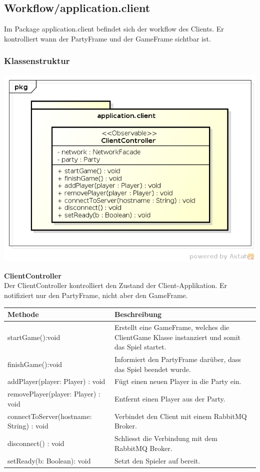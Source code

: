 \documentclass[11pt]{scrartcl}
\begin{document}
\newpage

\subsection{Workflow/application.client}
Im Package application.client befindet sich der workflow des Clients. Er kontrolliert wann der PartyFrame und der GameFrame sichtbar ist.

\subsubsection{Klassenstruktur}
\includegraphics[scale=0.75]{ClassDiagramApplicationClient}

\textbf{ClientController}\\
Der ClientController kontrolliert den Zustand der Client-Applikation. Er notifiziert nur den PartyFrame, nicht aber den GameFrame.\\

\begin{tabularx}{\linewidth}{l p{9cm}}
\textbf{Methode} & \textbf{Beschreibung}\\
\hline
startGame():void & Erstellt eine GameFrame, welches die ClientGame Klasse instanziert und somit das Spiel startet.\\
finishGame():void & Informiert den PartyFrame darüber, dass das Spiel beendet wurde.\\
addPlayer(player: Player) : void & Fügt einen neuen Player in die Party ein.\\
removePlayer(player: Player) : void & Entfernt einen Player aus der Party.\\
connectToServer(hostname: String) : void & Verbindet den Client mit einem RabbitMQ Broker.\\
disconnect() : void & Schliesst die Verbindung mit dem RabbitMQ Broker.\\
setReady(b: Boolean): void & Setzt den Spieler auf bereit.\\

\end{tabularx}
\end{document}

